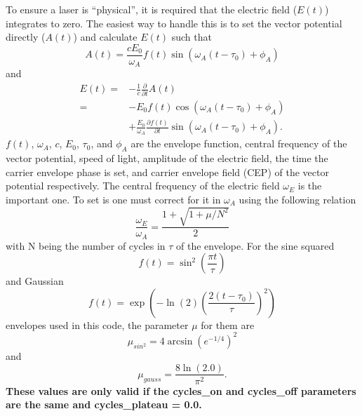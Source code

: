 \documentclass{article}
\begin{document}
To ensure a laser is ``physical'', it is required that the electric field ($E(t)$) integrates to zero. The easiest way to handle this is to set the vector potential directly ($A(t)$) and calculate $E(t)$ such that
\begin{equation}
A(t) = \frac{cE_0}{\omega_A} f(t) \sin(\omega_A(t-\tau_0)+\phi_A)
\label{eq:afield}
\end{equation}
and
\begin{equation}
\begin{split}
\label{eq:efield}
E(t) =& -\frac{1}{c}\frac{\partial}{\partial t}A(t)
\\
=&-E_0f(t) \cos(\omega_A (t-\tau_0) +\phi_A)
\\
&
+\frac{E_0}{\omega_A}\frac{\partial f(t)}{\partial t}
\sin(\omega_A (t-\tau_0) +\phi_A).
\end{split}
\end{equation}
$f(t)$, $\omega_A$,
$c$, $E_0$, $\tau_0$, and $\phi_A$ are the envelope function, central frequency of the vector potential, speed of light, amplitude of the electric field, the time the carrier envelope phase is set, and carrier envelope field (CEP) of the vector potential respectively. The central frequency of the electric field $\omega_E$ is the important one. To set is one must correct for it in $\omega_A$ using the following relation
\begin{equation}
\label{eq:fshift}
\frac{\omega_E}{\omega_A} = \frac{1+\sqrt{1+\mu/N^{2}}}{2}
\end{equation}
with N being the number of cycles in $\tau$ of the envelope. For the sine squared
\begin{equation}
f(t) = \sin^2\left(\frac{\pi t}{\tau}\right)
\label{eq:sin2}
\end{equation}
and Gaussian
\begin{equation}
f(t) = \exp\left(-\ln(2)\left(\frac{2(t-\tau_0)}{\tau}\right)^2\right)
\label{eq:gauss}
\end{equation}
envelopes used in this code, the parameter $\mu$ for them are
\begin{equation}
  \mu_{sin^2} = 4  \arcsin(e^{-1 / 4})^2
\end{equation}
and
\begin{equation}
  \mu_{gauss} = \frac{8 \ln(2.0) }{ \pi^2}.
\end{equation}
\textbf{These values are only valid if the cycles\_on and cycles\_off parameters are the same and cycles\_plateau = 0.0.}
\end{document}
